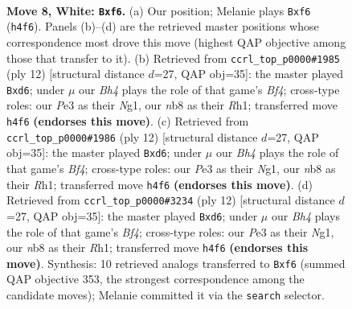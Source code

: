 \documentclass[11pt]{article}
\begin{document}
\begin{figure}[p]\centering
\begin{subfigure}{0.46\textwidth}\centering
\resizebox{\linewidth}{!}{%
\newchessgame
\chessboard[
  setfen={rnbqk2r/pp2bpp1/2p2n2/3p3p/3P3B/2N1P3/PP3PPP/R2QKBNR w KQkq - 0 8},
  showmover=false,
  pgfstyle=straightmove, color=movearrow, markmove={h4-f6}
]}
\caption{}
\end{subfigure}\hfill
\begin{subfigure}{0.46\textwidth}\centering
\resizebox{\linewidth}{!}{%
\newchessgame
\chessboard[
  setfen={rnbqk2r/1pp2ppp/p2b1n2/3p4/3P1B2/2N1P3/PP3PPP/R2QKBNR w KQkq - 1 7},
  showmover=false,
  pgfstyle=straightmove, color=movearrow, markmove={f4-d6}
]}
\caption{}
\end{subfigure}
\\[4pt]
\begin{subfigure}{0.46\textwidth}\centering
\resizebox{\linewidth}{!}{%
\newchessgame
\chessboard[
  setfen={rnbqk2r/1pp2ppp/p2b1n2/3p4/3P1B2/2N1P3/PP3PPP/R2QKBNR w KQkq - 1 7},
  showmover=false,
  pgfstyle=straightmove, color=movearrow, markmove={f4-d6}
]}
\caption{}
\end{subfigure}\hfill
\begin{subfigure}{0.46\textwidth}\centering
\resizebox{\linewidth}{!}{%
\newchessgame
\chessboard[
  setfen={rnbqk2r/1pp2ppp/p2b1n2/3p4/3P1B2/2N1P3/PP3PPP/R2QKBNR w KQkq - 1 7},
  showmover=false,
  pgfstyle=straightmove, color=movearrow, markmove={f4-d6}
]}
\caption{}
\end{subfigure}
\caption{\textbf{Move 8, White: \texttt{Bxf6}.} (a) Our position; Melanie plays \texttt{Bxf6} (\texttt{h4f6}). Panels (b)--(d) are the retrieved master positions whose correspondence most drove this move (highest QAP objective among those that transfer to it). (b) Retrieved from \texttt{ccrl\_top\_p0000\#1985} (ply 12) [structural distance $d$=27, QAP obj=35]: the master played \texttt{Bxd6}; under $\mu$ our \emph{Bh4} plays the role of that game's \emph{Bf4}; cross-type roles: our \emph{P}e3 as their \emph{N}g1, our \emph{n}b8 as their \emph{R}h1; transferred move \texttt{h4f6} \textbf{(endorses this move)}. (c) Retrieved from \texttt{ccrl\_top\_p0000\#1986} (ply 12) [structural distance $d$=27, QAP obj=35]: the master played \texttt{Bxd6}; under $\mu$ our \emph{Bh4} plays the role of that game's \emph{Bf4}; cross-type roles: our \emph{P}e3 as their \emph{N}g1, our \emph{n}b8 as their \emph{R}h1; transferred move \texttt{h4f6} \textbf{(endorses this move)}. (d) Retrieved from \texttt{ccrl\_top\_p0000\#3234} (ply 12) [structural distance $d$=27, QAP obj=35]: the master played \texttt{Bxd6}; under $\mu$ our \emph{Bh4} plays the role of that game's \emph{Bf4}; cross-type roles: our \emph{P}e3 as their \emph{N}g1, our \emph{n}b8 as their \emph{R}h1; transferred move \texttt{h4f6} \textbf{(endorses this move)}. Synthesis: 10 retrieved analogs transferred to \texttt{Bxf6} (summed QAP objective 353, the strongest correspondence among the candidate moves); Melanie committed it via the \texttt{search} selector.}
\label{fig:thought-m14}
\end{figure}
\end{document}
